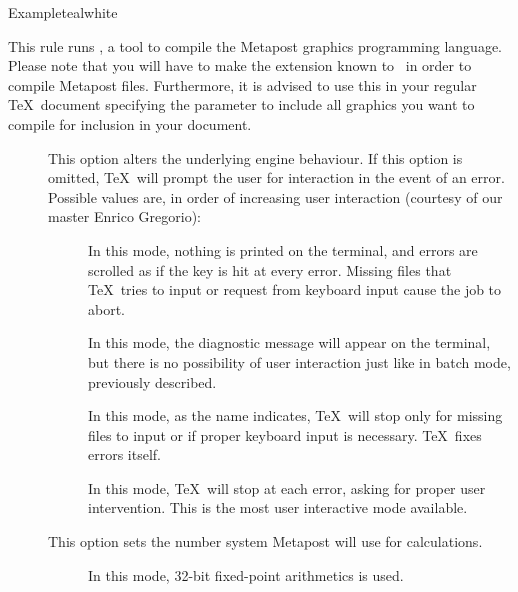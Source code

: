 \begin{description}
\begin{codebox}{Example}{teal}{\icnote}{white}
\end{codebox}

\item[\rulebox{metapost}]
This rule runs , a tool to compile the Metapost graphics programming language. Please note that you will have to make the  extension known to \arara\ in order to compile Metapost files. Furthermore, it is advised to use this in your regular \TeX\ document specifying the  parameter to include all graphics you want to compile for inclusion in your document.

\begin{description}
\item[] This option alters the underlying engine behaviour. If this option is omitted, \TeX\ will prompt the user for interaction in the event of an error. Possible values are, in order of increasing user interaction (courtesy of our master Enrico Gregorio):

\begin{description}
\item[] In this mode, nothing is printed on the terminal, and errors are scrolled as if the  key is hit at every error. Missing files that \TeX\ tries to input or request from keyboard input cause the job to abort.

\item[] In this mode, the diagnostic message will appear on the terminal, but there is no possibility of user interaction just like in batch mode, previously described.

\item[] In this mode, as the name indicates, \TeX\ will stop only for missing files to input or if proper keyboard input is necessary. \TeX\ fixes errors itself.

\item[] In this mode, \TeX\ will stop at each error, asking for proper user intervention. This is the most user interactive mode available.
\end{description}

\item[] This option sets the number system Metapost will use for calculations.

\begin{description}
\item[] In this mode, 32-bit fixed-point arithmetics is used.


\end{description}
\end{description}
\end{description}
